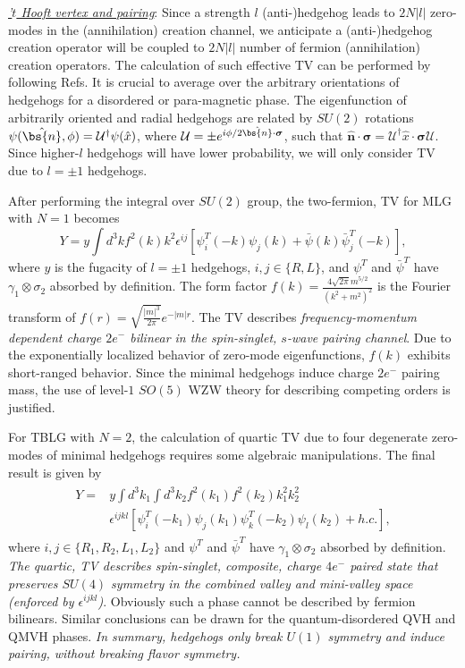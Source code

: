 \documentclass[aps,prb,amsmath,amssymb,floatfix,twocolumn]{revtex4}
\begin{document}
\underline{\emph{'$t$ Hooft vertex and pairing}}: Since a strength $l$ (anti-)hedgehog leads to $2N |l|$ zero-modes in the (annihilation) creation channel, we anticipate a (anti-)hedgehog creation operator will be coupled to $2 N |l|$ number of fermion (annihilation) creation operators. The calculation of such effective TV can be performed by following Refs. \cite{'T Hooft,Shuryak,GoswamiSi3} It is crucial to average over the arbitrary orientations of hedgehogs for a disordered or para-magnetic phase. The eigenfunction of arbitrarily oriented and radial hedgehogs are related by $SU(2)$ rotations $\psi(\hat{\bs{n}}, \phi)=\mathcal{U}^\dagger \psi(\hat{x})$, where $\mathcal{U}=\pm e^{i \phi/2 \hat{\bs{n}} \cdot \boldsymbol \sigma}$, such that $\hat{\mathbf{n}} \cdot \boldsymbol \sigma =\mathcal{U}^\dagger \hat{x} \cdot \boldsymbol \sigma \mathcal{U}$. Since higher-$l$ hedgehogs will have lower probability, we will only consider TV due to $l=\pm 1$ hedgehogs.

After performing the integral over $SU(2)$ group, the two-fermion, TV for MLG with $N=1$ becomes
\begin{equation}
Y=y \int d^3k f^2(k)k^2 \epsilon^{ij}[\psi_i^T(-k)\psi_j(k)+\bar{\psi}(k)\bar{\psi}^T_j(-k)], \label{eqTV1}
\end{equation}
where $y$ is the fugacity of $l = \pm 1$ hedgehogs, $i,j\in\{R,L\}$, and $\psi^T$ and $\bar{\psi}^T$ have $\gamma_1 \otimes\sigma_2$ absorbed by definition. The form factor $f(k)=\frac{4\sqrt{2\pi}m^{5/2}}{(k^2+m^2)^2}$ is the Fourier transform of $f(r)=\sqrt{\frac{|m|^3}{2\pi}}e^{-|m|r}$. The TV describes \emph{frequency-momentum dependent charge $2e^-$ bilinear in the spin-singlet, $s$-wave pairing channel}. Due to the exponentially localized behavior of zero-mode eigenfunctions, $f(k)$ exhibits short-ranged behavior. Since the minimal hedgehogs induce charge $2e^-$ pairing mass, the use of level-$1$ $SO(5)$ WZW theory for describing competing orders is justified.  

 
\indent For TBLG with $N=2$, the calculation of quartic TV due to four degenerate zero-modes of minimal hedgehogs requires some algebraic manipulations. The final result is given by
\begin{align}
\begin{split}
Y=&y\int d^3k_1 \int d^3k_2 f^2(k_1)f^2(k_2)k_1^2k_2^2\\
&\epsilon^{ijkl}[\psi^T_i(-k_1)\psi_j(k_1)\psi^T_k(-k_2)\psi_l(k_2)+h.c.], \label{eq9}
\end{split}
\end{align}
where $i,j\in\{R_1,R_2,L_1,L_2\}$ and $\psi^T$ and $\bar{\psi}^T$ have $\gamma_1 \otimes\sigma_2$ absorbed by definition. \emph{The quartic, TV describes spin-singlet, composite, charge $4e^-$ paired state that preserves $SU(4)$ symmetry in the combined valley and mini-valley space (enforced by $\epsilon^{ijkl}$)}.   Obviously such a phase cannot be described by fermion bilinears. Similar conclusions can be drawn for the quantum-disordered QVH and QMVH phases. \emph{In summary, hedgehogs only break $U(1)$ symmetry and induce pairing, without breaking flavor symmetry.}    
\end{document}
